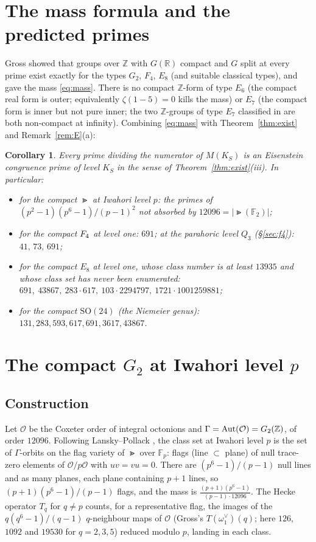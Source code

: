 \documentclass[11pt]{amsart}
\newtheorem{corollary}[theorem]{Corollary}
\theoremstyle{definition}
\newcommand{\Z}{\mathbb{Z}}\newcommand{\Q}{\mathbb{Q}}\newcommand{\R}{\mathbb{R}}\newcommand{\A}{\mathbb{A}}\newcommand{\F}{\mathbb{F}}
\begin{document}
\section{The mass formula and the predicted primes}\label{sec:law}
Gross \cite{Gross-Z} showed that groups over $\Z$ with $G(\R)$ compact and $G$ split at every prime exist exactly for the types $G_2$, $F_4$, $E_8$ (and suitable classical types), and gave the mass \eqref{eq:mass}. There is no compact $\Z$-form of type $E_6$ (the compact real form is outer; equivalently $\zeta(1-5)=0$ kills the mass) or $E_7$ (the compact form is inner but not pure inner; the two $\Z$-groups of type $E_7$ classified in \cite{GPR} are both non-compact at infinity). Combining \eqref{eq:mass} with Theorem~\ref{thm:exist} and Remark~\ref{rem:E}(a):
\begin{corollary}\label{cor:law}
Every prime dividing the numerator of $M(K_S)$ is an Eisenstein congruence prime of level $K_S$ in the sense of Theorem~\ref{thm:exist}(iii). In particular:
\begin{itemize}
\item for the compact $\Gt$ at Iwahori level $p$: the primes of $(p^2-1)(p^6-1)/(p-1)^2$ not absorbed by $12096=|\Gt(\F_2)|$;
\item for the compact $F_4$ at level one: $691$; at the parahoric level $Q_3$ (\S\ref{sec:f4}): $41,\,73,\,691$;
\item for the compact $E_8$ at level one, whose class number is at least $13935$ and whose class set has never been enumerated: $691,\ 43867,\ 283\cdot617,\ 103\cdot2294797,\ 1721\cdot1001259881$;
\item for the compact $\mathrm{SO}(24)$ (the Niemeier genus): $131,283,593,617,691,3617,43867$.
\end{itemize}
\end{corollary}

\section{The compact $G_2$ at Iwahori level $p$}\label{sec:g2}
\subsection{Construction} Let $\mathcal O$ be the Coxeter order of integral octonions and $\Gamma=\Aut(\mathcal O)=\Gt(\Z)$, of order $12096$. Following Lansky--Pollack \cite{LP}, the class set at Iwahori level $p$ is the set of $\Gamma$-orbits on the flag variety of $\Gt$ over $\F_p$: flags (line $\subset$ plane) of null trace-zero elements of $\mathcal O/p\mathcal O$ with $uv=vu=0$. There are $(p^6-1)/(p-1)$ null lines and as many planes, each plane containing $p+1$ lines, so $(p+1)(p^6-1)/(p-1)$ flags, and the mass is $\frac{(p+1)(p^6-1)}{(p-1)\cdot12096}$. The Hecke operator $T_q$ for $q\ne p$ counts, for a representative flag, the images of the $q(q^6-1)/(q-1)$ $q$-neighbour maps of $\mathcal O$ (Gross's $T(\omega_1^\vee)(q)$; here $126$, $1092$ and $19530$ for $q=2,3,5$) reduced modulo $p$, landing in each class.
\end{document}
